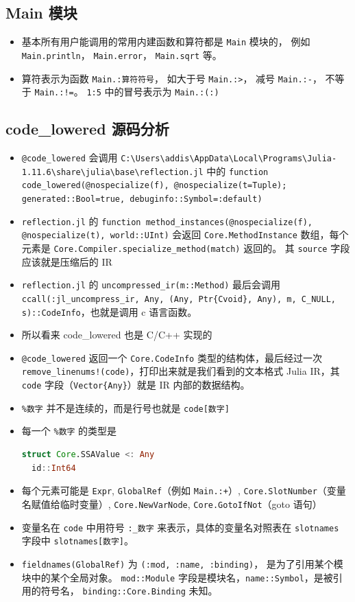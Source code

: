 \subsection{Main 模块}

\begin{itemize}
\item 基本所有用户能调用的常用内建函数和算符都是 \verb`Main` 模块的， 例如 \verb`Main.println`， \verb`Main.error`， \verb`Main.sqrt` 等。
\item 算符表示为函数 \verb`Main.:算符符号`， 如大于号 \verb`Main.:>`， 减号 \verb`Main.:-`， 不等于 \verb`Main.:!=`。 \verb`1:5` 中的冒号表示为 \verb`Main.:(:)`
\end{itemize}

\subsection{code_lowered 源码分析}
\begin{itemize}
\item \verb`@code_lowered` 会调用 \verb`C:\Users\addis\AppData\Local\Programs\Julia-1.11.6\share\julia\base\reflection.jl` 中的 \verb`function code_lowered(@nospecialize(f), @nospecialize(t=Tuple); generated::Bool=true, debuginfo::Symbol=:default)`
\item \verb`reflection.jl` 的 \verb`function method_instances(@nospecialize(f), @nospecialize(t), world::UInt)` 会返回 \verb`Core.MethodInstance` 数组，每个元素是 \verb`Core.Compiler.specialize_method(match)` 返回的。 其 \verb`source` 字段应该就是压缩后的 IR
\item \verb`reflection.jl` 的 \verb`uncompressed_ir(m::Method)` 最后会调用 \verb`ccall(:jl_uncompress_ir, Any, (Any, Ptr{Cvoid}, Any), m, C_NULL, s)::CodeInfo`，也就是调用 c 语言函数。
\item 所以看来 code_lowered 也是 C/C++ 实现的
\item \verb`@code_lowered` 返回一个 \verb`Core.CodeInfo` 类型的结构体，最后经过一次 \verb`remove_linenums!(code)`，打印出来就是我们看到的文本格式 Julia IR，其 \verb`code` 字段（\verb`Vector{Any}`）就是 IR 内部的数据结构。
\item \verb`%数字` 并不是连续的，而是行号也就是 \verb`code[数字]`
\item 每一个 \verb`%数字` 的类型是
\begin{lstlisting}[language=julia]
struct Core.SSAValue <: Any
  id::Int64
\end{lstlisting}
\item 每个元素可能是 \verb`Expr`, \verb`GlobalRef`（例如 \verb`Main.:+`）, \verb`Core.SlotNumber`（变量名赋值给临时变量）, \verb`Core.NewVarNode`, \verb`Core.GotoIfNot`（goto 语句）
\item 变量名在 \verb`code` 中用符号 \verb`:_数字` 来表示，具体的变量名对照表在 \verb`slotnames` 字段中 \verb`slotnames[数字]`。
\item \verb`fieldnames(GlobalRef)` 为 \verb`(:mod, :name, :binding)`， 是为了引用某个模块中的某个全局对象。 \verb`mod::Module` 字段是模块名，\verb`name::Symbol`，是被引用的符号名， \verb`binding::Core.Binding` 未知。
\end{itemize}

